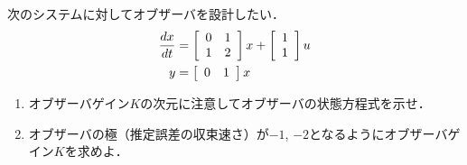 \item
次のシステムに対してオブザーバを設計したい．
\begin{align}
	\frac{dx}{dt}
	&=	\bmatrix{cc}
			0 & 1 \\
			1 & 2
		\ematrix
		x
		+
		\bmatrix{c}
			1 \\
			1 
		\ematrix
		u
\nonumber \\
	y 
	&=	\bmatrix{cc}
			0 & 1 
		\ematrix
		x
\nonumber 
\end{align}

\begin{enumerate}

\item 
オブザーバゲイン$K$の次元に注意してオブザーバの状態方程式を示せ．
\vspace{5cm}

\item
オブザーバの極（推定誤差の収束速さ）が$-1$, $-2$となるようにオブザーバゲイン$K$を求めよ．
\vspace{8cm}

\end{enumerate}
